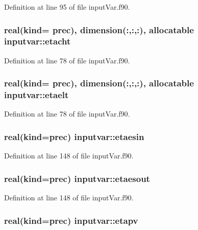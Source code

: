 Definition at line 95 of file input\-Var.\-f90.

\hypertarget{classinputvar_a7cd43a0a5d5ddb8d50af96d4c4f81bea}{
\subsubsection[{etacht}]{\setlength{\rightskip}{0pt plus 5cm}real(kind= prec), dimension(\-:,\-:,\-:), allocatable inputvar\-::etacht}}\label{classinputvar_a7cd43a0a5d5ddb8d50af96d4c4f81bea}


Definition at line 78 of file input\-Var.\-f90.

\hypertarget{classinputvar_af7479b2afabbd7d596d91bb1319b0a8e}{
\subsubsection[{etaelt}]{\setlength{\rightskip}{0pt plus 5cm}real(kind= prec), dimension(\-:,\-:,\-:), allocatable inputvar\-::etaelt}}\label{classinputvar_af7479b2afabbd7d596d91bb1319b0a8e}


Definition at line 78 of file input\-Var.\-f90.

\hypertarget{classinputvar_abd4dda94e6c1b4279f7b987b00a1944b}{
\subsubsection[{etaesin}]{\setlength{\rightskip}{0pt plus 5cm}real(kind=prec) inputvar\-::etaesin}}\label{classinputvar_abd4dda94e6c1b4279f7b987b00a1944b}


Definition at line 148 of file input\-Var.\-f90.

\hypertarget{classinputvar_a3b0799d84e3b3f626084c324e6b2a699}{
\subsubsection[{etaesout}]{\setlength{\rightskip}{0pt plus 5cm}real(kind=prec) inputvar\-::etaesout}}\label{classinputvar_a3b0799d84e3b3f626084c324e6b2a699}


Definition at line 148 of file input\-Var.\-f90.

\hypertarget{classinputvar_abd526b84db5033c573303c7859b28963}{
\subsubsection[{etapv}]{\setlength{\rightskip}{0pt plus 5cm}real(kind=prec) inputvar\-::etapv}}\label{classinputvar_abd526b84db5033c573303c7859b28963}


